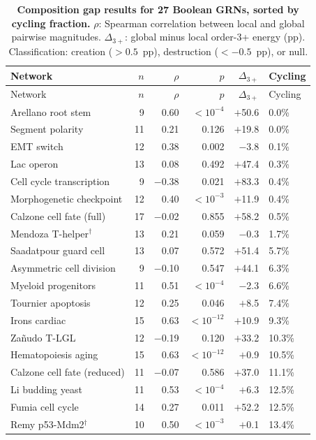 \documentclass[10pt,letterpaper]{article}
\begin{document}
\begin{longtable}{lrrrrl}
\caption{{\bf Composition gap results for 27 Boolean GRNs, sorted by
cycling fraction.} $\rho$: Spearman correlation between local and
global pairwise magnitudes. $\Delta_{3+}$: global minus local
order-3+ energy (pp). Classification: creation ($> 0.5$~pp),
destruction ($< -0.5$~pp), or null.}
\label{tab:all_results} \\
\toprule
Network & $n$ & $\rho$ & $p$ & $\Delta_{3+}$ & Cycling \\
\midrule
\endfirsthead
\toprule
Network & $n$ & $\rho$ & $p$ & $\Delta_{3+}$ & Cycling \\
\midrule
\endhead
\bottomrule
\endfoot
Arellano root stem & 9 & 0.60 & $< 10^{-4}$ & $+$50.6 & 0.0\% \\
Segment polarity & 11 & 0.21 & 0.126 & $+$19.8 & 0.0\% \\
EMT switch & 12 & 0.38 & 0.002 & $-$3.8 & 0.1\% \\
Lac operon & 13 & 0.08 & 0.492 & $+$47.4 & 0.3\% \\
Cell cycle transcription & 9 & $-$0.38 & 0.021 & $+$83.3 & 0.4\% \\
Morphogenetic checkpoint & 12 & 0.40 & $< 10^{-3}$ & $+$11.9 & 0.4\% \\
Calzone cell fate (full) & 17 & $-$0.02 & 0.855 & $+$58.2 & 0.5\% \\
Mendoza T-helper$^\dagger$ & 13 & 0.21 & 0.059 & $-$0.3 & 1.7\% \\
Saadatpour guard cell & 13 & 0.07 & 0.572 & $+$51.4 & 5.7\% \\
Asymmetric cell division & 9 & $-$0.10 & 0.547 & $+$44.1 & 6.3\% \\
Myeloid progenitors & 11 & 0.51 & $< 10^{-4}$ & $-$2.3 & 6.6\% \\
Tournier apoptosis & 12 & 0.25 & 0.046 & $+$8.5 & 7.4\% \\
Irons cardiac & 15 & 0.63 & $< 10^{-12}$ & $+$10.9 & 9.3\% \\
Za\~nudo T-LGL & 12 & $-$0.19 & 0.120 & $+$33.2 & 10.3\% \\
Hematopoiesis aging & 15 & 0.63 & $< 10^{-12}$ & $+$0.9 & 10.5\% \\
Calzone cell fate (reduced) & 11 & $-$0.07 & 0.586 & $+$37.0 & 11.1\% \\
Li budding yeast & 11 & 0.53 & $< 10^{-4}$ & $+$6.3 & 12.5\% \\
Fumia cell cycle & 14 & 0.27 & 0.011 & $+$52.2 & 12.5\% \\
Remy p53-Mdm2$^\dagger$ & 10 & 0.50 & $< 10^{-3}$ & $+$0.1 & 13.4\% \\

\end{longtable}
\end{document}
